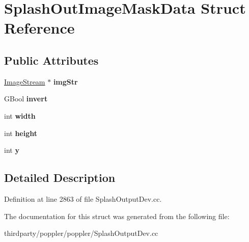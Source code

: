 \hypertarget{struct_splash_out_image_mask_data}{}\section{Splash\+Out\+Image\+Mask\+Data Struct Reference}
\label{struct_splash_out_image_mask_data}
\subsection*{Public Attributes}
\begin{DoxyCompactItemize}
\item 
\mbox{\label{struct_splash_out_image_mask_data_a4c1a83e573f7dc9e0341815f4e869a99}} 
\hyperlink{class_image_stream}{Image\+Stream} $\ast$ {\bfseries img\+Str}
\item 
\mbox{\label{struct_splash_out_image_mask_data_aede4d69199867c69241fda1a5cbef067}} 
G\+Bool {\bfseries invert}
\item 
\mbox{\label{struct_splash_out_image_mask_data_a68c21d3bdd9e026f0b68d18616b82797}} 
int {\bfseries width}
\item 
\mbox{\label{struct_splash_out_image_mask_data_a2660a39366a3a9891366454d30fd947e}} 
int {\bfseries height}
\item 
\mbox{\label{struct_splash_out_image_mask_data_ac95db91cbfbf100387bf324a2f2893ef}} 
int {\bfseries y}
\end{DoxyCompactItemize}


\subsection{Detailed Description}


Definition at line 2863 of file Splash\+Output\+Dev.\+cc.



The documentation for this struct was generated from the following file\+:\begin{DoxyCompactItemize}
\item 
thirdparty/poppler/poppler/Splash\+Output\+Dev.\+cc\end{DoxyCompactItemize}
